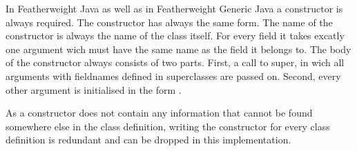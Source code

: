 In Featherweight Java as well as in Featherweight Generic Java a constructor is always required. The constructor has always the same form.
The name of the constructor is always the name of the class itself. For every field it takes excatly one argument wich must have the same name as the field it belongs to.
The body of the constructor always consists of two parts. First, a call to super, in wich all arguments with fieldnames defined in superclasses are passed on.
Second, every other argument is initialised in the form .

As a constructor does not contain any information that cannot be found somewhere else in the class definition, writing the constructor for every class definition is redundant and can be dropped in this implementation.
